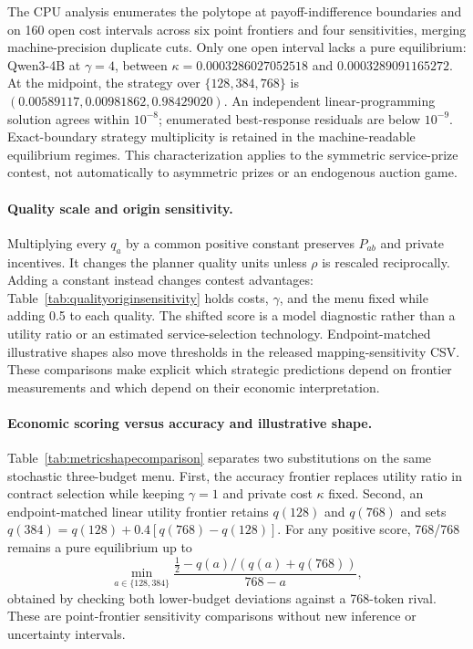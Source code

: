 \documentclass{article}
\begin{document}
The CPU analysis enumerates the polytope at payoff-indifference boundaries and on 160 open cost intervals across six point frontiers and four sensitivities, merging machine-precision duplicate cuts. Only one open interval lacks a pure equilibrium: Qwen3-4B at $\gamma=4$, between $\kappa=0.0003286027052518$ and $0.0003289091165272$. At the midpoint, the strategy over $\{128,384,768\}$ is $(0.00589117,0.00981862,0.98429020)$. An independent linear-programming solution agrees within $10^{-8}$; enumerated best-response residuals are below $10^{-9}$. Exact-boundary strategy multiplicity is retained in the machine-readable equilibrium regimes. This characterization applies to the symmetric service-prize contest, not automatically to asymmetric prizes or an endogenous auction game.

\paragraph{Quality scale and origin sensitivity.}
Multiplying every $q_a$ by a common positive constant preserves $P_{ab}$ and private incentives. It changes the planner quality units unless $\rho$ is rescaled reciprocally. Adding a constant instead changes contest advantages: Table~\ref{tab:qualityoriginsensitivity} holds costs, $\gamma$, and the menu fixed while adding 0.5 to each quality. The shifted score is a model diagnostic rather than a utility ratio or an estimated service-selection technology. Endpoint-matched illustrative shapes also move thresholds in the released mapping-sensitivity CSV. These comparisons make explicit which strategic predictions depend on frontier measurements and which depend on their economic interpretation.


\paragraph{Economic scoring versus accuracy and illustrative shape.}
Table~\ref{tab:metricshapecomparison} separates two substitutions on the same stochastic three-budget menu. First, the accuracy frontier replaces utility ratio in contract selection while keeping $\gamma=1$ and private cost $\kappa$ fixed. Second, an endpoint-matched linear utility frontier retains $q(128)$ and $q(768)$ and sets $q(384)=q(128)+0.4[q(768)-q(128)]$. For any positive score, 768/768 remains a pure equilibrium up to
\[
\min_{a\in\{128,384\}}
\frac{\tfrac12-q(a)/(q(a)+q(768))}{768-a},
\]
obtained by checking both lower-budget deviations against a 768-token rival. These are point-frontier sensitivity comparisons without new inference or uncertainty intervals.
\end{document}
